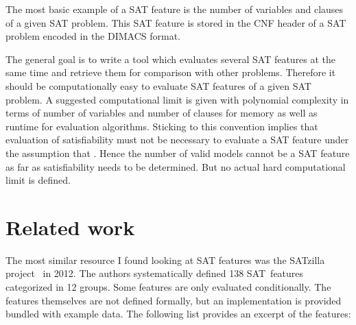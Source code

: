 The most basic example of a SAT feature is the number of variables and clauses
of a given SAT problem. This SAT feature is stored in the CNF header of a SAT
problem encoded in the DIMACS format.

The general goal is to write a tool which evaluates several SAT features at the same
time and retrieve them for comparison with other problems. Therefore it should be
computationally easy to evaluate SAT features of a given SAT problem. A suggested
computational limit is given with polynomial complexity in terms of number of
variables and number of clauses for memory as well as runtime for evaluation algorithms.
Sticking to this convention implies that evaluation of satisfiability must not be
necessary to evaluate a SAT feature under the assumption that \cPneqNP. Hence the
number of valid models cannot be a SAT feature as far as satisfiability needs to
be determined. But no actual hard computational limit is defined.

\section{Related work}
\label{sec:features-related}
%
The most similar resource I found looking at SAT features was the
SATzilla project~\cite{satzilla2004,satzilla2008} in 2012. The authors systematically defined
138 SAT~features categorized in 12 groups. Some features are only evaluated conditionally.
The features themselves are not defined formally, but an implementation is provided bundled
with example data. The following list provides an excerpt of the features:

